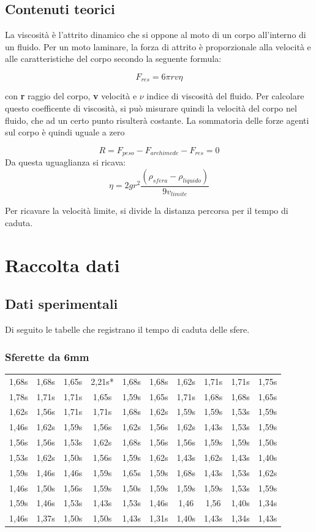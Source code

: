 \subsection{Contenuti teorici}
La viscosità è l'attrito dinamico che si oppone al moto di un corpo all'interno di un fluido. Per un moto laminare, la forza di attrito è proporzionale alla velocità e alle caratteristiche del corpo secondo la seguente formula:

$$F_{res} = 6 \pi r v \eta $$

con \textbf{r}  raggio del corpo,\textbf{ v} velocità e $\nu$ indice di viscosità del fluido. 
Per calcolare questo coefficente di viscosità, si può misurare quindi la velocità del corpo nel fluido, che ad un certo punto risulterà costante. La sommatoria delle forze agenti sul corpo è quindi uguale a zero

$$ R = F_{peso} - F_{archimede} - F_{res} = 0 $$
Da questa uguaglianza si ricava:
$$ \eta= 2 g r^2\frac{(\rho_{sfera} - \rho_{liquido})}{9v_{limite}}$$

Per ricavare la velocità limite, si divide la distanza percorsa per il tempo di caduta. 

\section{Raccolta dati}


\subsection{Dati sperimentali}
Di seguito le tabelle che registrano il tempo di caduta delle sfere.
\subsubsection{Sferette da 6mm}
\begin{tabular}{c|c|c|c|c|c|c|c|c|c}
\toprule
 1,68s & 1,68s & 1,65s & 2,21s* & 1,68s & 1,68s & 1,62s & 1,71s & 1,71s & 1,75s \\
 1,78s & 1,71s & 1,71s & 1,65s & 1,59s  & 1,65s  & 1,71s  & 1,68s & 1,68s & 1,65s \\
\midrule
 1,62s & 1,56s & 1,71s & 1,71s & 1,68s & 1,62s & 1,59s & 1,59s & 1,53s & 1,59s \\
 1,46s & 1,62s & 1,59s & 1,56s & 1,62s & 1,56s & 1,62s & 1,43s & 1,53s & 1,59s \\
\midrule
 1,56s & 1,56s & 1,53s & 1,62s & 1,68s & 1,56s & 1,56s & 1,59s & 1,59s & 1,50s\\
 1,53s & 1,62s & 1,50s & 1,56s & 1,59s & 1,62s & 1,43s & 1,62s & 1,43s & 1,40s \\
\midrule
 1,59s & 1,46s & 1,46s & 1,59s & 1,65s & 1,59s & 1,68s & 1,43s & 1,53s & 1,62s \\
 1,46s & 1,50s & 1,56s & 1,59s & 1,50s & 1,59s  & 1,59s & 1,59s & 1,53s & 1,59s \\
\midrule
1,59s & 1,46s & 1,53s & 1,43s & 1,53s & 1,46s & 1,46 & 1,56 & 1,40s & 1,34s \\
1,46s & 1,37s  & 1,50s   & 1,50s  & 1,43s & 1,31s & 1,40s  & 1,43s  & 1,34s & 1,43s \\
\bottomrule
\end{tabular}

